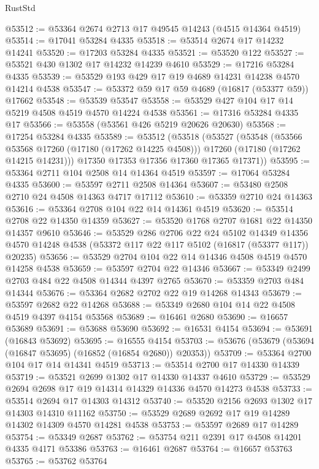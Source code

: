 \begin{lexlean}{RustStd}
\begin{coremodule}
@53512 := @53364 @2674 @2713 @17 @49545 @14243 (@4515 @14364 @4519)
@53514 := @17041 @53284 @4335
@53518 := @53514 @2674 @17 @14232 @14241
@53520 := @17203 @53284 @4335
@53521 := @53520 @122
@53527 := @53521 @430 @1302 @17 @14232 @14239 @4610
@53529 := @17216 @53284 @4335
@53539 := @53529 @193 @429 @17 @19 @4689 @14231 @14238 @4570 @14214 @4538
@53547 := @53372 @59 @17 @59 @4689 (@16817 (@53377 @59)) @17662
@53548 := @53539 @53547
@53558 := @53529 @427 @104 @17 @14 @5219 @4508 @4519 @4570 @14224 @4538
@53561 := @17316 @53284 @4335 @17
@53566 := @53558 (@53561 @426 @5219 @20626 @20630)
@53568 := @17254 @53284 @4335
@53589 := @53512
    (@53518
      (@53527
        (@53548
          (@53566 @53568 @17260 (@17180 (@17262 @14225 @4508)))
          @17260
          (@17180 (@17262 @14215 @14231)))
        @17350
        @17353
        @17356
        @17360
        @17365
        @17371))
@53595 := @53364 @2711 @104 @2508 @14 @14364 @4519
@53597 := @17064 @53284 @4335
@53600 := @53597 @2711 @2508 @14364
@53607 := @53480 @2508 @2710 @24 @4508 @14363 @4717 @17112
@53610 := @53359 @2710 @24 @14363
@53616 := @53364 @2708 @104 @22 @14 @14361 @4519
@53620 := @53514 @2708 @22 @14350 @14359
@53627 := @53520 @1768 @2707 @1681 @22 @14350 @14357 @9610
@53646 := @53529
    @286
    @2706
    @22
    @24
    @5102
    @14349
    @14356
    @4570
    @14248
    @4538
    (@53372 @117 @22 @117 @5102 (@16817 (@53377 @117)) @20235)
@53656 := @53529 @2704 @104 @22 @14 @14346 @4508 @4519 @4570 @14258 @4538
@53659 := @53597 @2704 @22 @14346
@53667 := @53349 @2499 @2703 @484 @22 @4508 @14344 @4397 @2765
@53670 := @53359 @2703 @484 @14344
@53676 := @53364 @2682 @2702 @22 @19 @14268 @14343
@53679 := @53597 @2682 @22 @14268
@53688 := @53349 @2680 @104 @14 @22 @4508 @4519 @4397 @4154 @53568
@53689 := @16461 @2680
@53690 := @16657 @53689
@53691 := @53688 @53690
@53692 := @16531 @4154
@53694 := @53691 (@16843 @53692)
@53695 := @16555 @4154
@53703 := @53676 (@53679 (@53694 (@16847 @53695) (@16852 (@16854 @2680)) @20353))
@53709 := @53364 @2700 @104 @17 @14 @14341 @4519
@53713 := @53514 @2700 @17 @14330 @14339
@53719 := @53521 @2699 @1302 @17 @14330 @14337 @4610
@53729 := @53529 @2694 @2698 @17 @19 @14314 @14329 @14336 @4570 @14273 @4538
@53733 := @53514 @2694 @17 @14303 @14312
@53740 := @53520 @2156 @2693 @1302 @17 @14303 @14310 @11162
@53750 := @53529 @2689 @2692 @17 @19 @14289 @14302 @14309 @4570 @14281 @4538
@53753 := @53597 @2689 @17 @14289
@53754 := @53349 @2687
@53762 := @53754 @211 @2391 @17 @4508 @14201 @4335 @4171 @53386
@53763 := @16461 @2687
@53764 := @16657 @53763
@53765 := @53762 @53764

\end{coremodule}
\end{lexlean}
